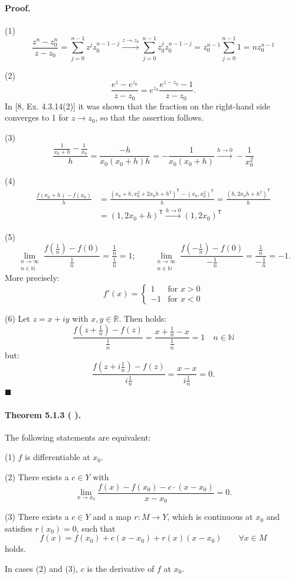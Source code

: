 \documentclass[12pt]{article}
\newcommand{\N}{\mathbb{N}}
\newcommand{\R}{\mathbb{R}}
\newcommand{\NumberedTheorem}[3]{%
\paragraph*{Theorem #1 ( #2 ).} #3\par}
\begin{document}
\paragraph*{Proof.}
(1)
\[
\frac{z^n - z_0^n}{z - z_0} = \sum_{j=0}^{n-1} z^j z_0^{n-1-j} \xrightarrow{z \to z_0} \sum_{j=0}^{n-1} z_0^j z_0^{n-1-j} = z_0^{n-1} \sum_{j=0}^{n-1} 1 = n z_0^{n-1}
\]

(2)
\[
\frac{e^z - e^{z_0}}{z - z_0} = e^{z_0} \frac{e^{z-z_0} - 1}{z - z_0}.
\]
In [8, Ex. 4.3.14(2)] it was shown that the fraction on the right-hand side converges to 1 for $z \to z_0$, so that the assertion follows.

(3)
\[
\frac{\frac{1}{x_0+h} - \frac{1}{x_0}}{h} = \frac{-h}{x_0(x_0+h)h} = -\frac{1}{x_0(x_0+h)} \xrightarrow{h \to 0} -\frac{1}{x_0^2}
\]

(4)
\begin{align*}
\frac{f(x_0+h) - f(x_0)}{h} &= \frac{(x_0+h, x_0^2 + 2x_0h + h^2)^\mathsf{T} - (x_0, x_0^2)^\mathsf{T}}{h} = \frac{(h, 2x_0h + h^2)^\mathsf{T}}{h} \\
&= (1, 2x_0+h)^\mathsf{T} \xrightarrow{h \to 0} (1, 2x_0)^\mathsf{T}
\end{align*}

(5)
\[
\lim_{\substack{n \to \infty \\ n \in \N}} \frac{f(\frac{1}{n}) - f(0)}{\frac{1}{n}} = \frac{\frac{1}{n}}{\frac{1}{n}} = 1; \qquad \lim_{\substack{n \to \infty \\ n \in \N}} \frac{f(-\frac{1}{n}) - f(0)}{-\frac{1}{n}} = \frac{\frac{1}{n}}{-\frac{1}{n}} = -1.
\]
More precisely:
\[
f'(x) = \begin{cases} 1 & \text{for } x > 0 \\ -1 & \text{for } x < 0 \end{cases}
\]

(6) Let $z = x + iy$ with $x, y \in \R$. Then holds:
\[
\frac{f(z+\frac{1}{n}) - f(z)}{\frac{1}{n}} = \frac{x+\frac{1}{n} - x}{\frac{1}{n}} = 1 \quad n \in \N
\]
but:
\[
\frac{f(z+i\frac{1}{n}) - f(z)}{i\frac{1}{n}} = \frac{x - x}{i\frac{1}{n}} = 0.
\]
\hfill $\blacksquare$

\NumberedTheorem{5.1.3}{}{The following statements are equivalent:
\par\medskip
(1) $f$ is differentiable at $x_0$.
\par\medskip
(2) There exists a $c \in Y$ with
\[
\lim_{x \to x_0} \frac{f(x) - f(x_0) - c \cdot (x - x_0)}{x - x_0} = 0.
\]
\par
(3) There exists a $c \in Y$ and a map $r : M \to Y$, which is continuous at $x_0$ and satisfies $r(x_0) = 0$, such that
\[
f(x) = f(x_0) + c(x - x_0) + r(x)(x - x_0) \qquad \forall x \in M
\]
holds.
\par\medskip
In cases (2) and (3), $c$ is the derivative of $f$ at $x_0$.}
\end{document}
